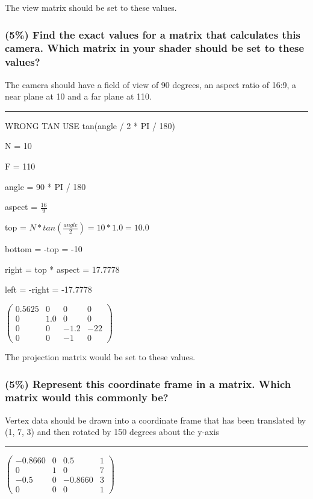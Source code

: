 The view matrix should be set to these values.

\subsubsection{(5\%) Find the exact values for a matrix that calculates this camera. Which matrix in your shader should be set to these values?}
The camera should have a field of view of 90 degrees, an aspect ratio of 16:9, a near plane at 10 and a far plane at 110.

\rule{\textwidth}{0.1mm}

WRONG TAN USE tan(angle / 2 * PI / 180)

N = 10

F = 110

angle = 90 * PI / 180

aspect = $\frac{16}{9}$

top = $ N * tan\left(\frac{angle}{2}\right) = 10 * 1.0 = 10.0 $

bottom = -top = -10

right = top * aspect = 17.7778

left = -right = -17.7778

$\left(\begin{array}{cccc}
    0.5625 & 0   & 0    & 0 \\
    0      & 1.0 & 0    & 0 \\
    0      & 0   & -1.2 & -22 \\
    0      & 0   & -1   & 0
\end{array}\right)$

The projection matrix would be set to these values.

\subsubsection{(5\%) Represent this coordinate frame in a matrix.  Which matrix would this commonly be?}

Vertex data should be drawn into a coordinate frame that has been translated by (1, 7, 3) and then rotated by 150 degrees about the y-axis

\rule{\textwidth}{0.1mm}

$\left(\begin{array}{cccc}
    -0.8660 & 0 & 0.5     & 1 \\
    0       & 1 & 0       & 7 \\
    -0.5    & 0 & -0.8660 & 3 \\
    0       & 0 & 0       & 1
\end{array}\right)$

